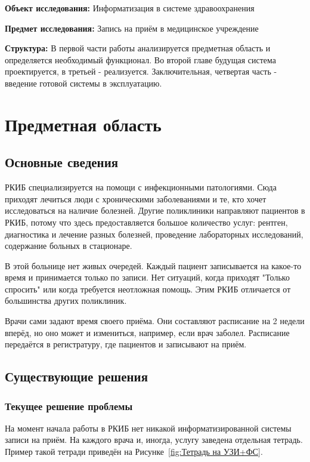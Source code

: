 \documentclass[a4paper,article]{article}
\begin{document}
        \textbf{Объект исследования:} Информатизация в системе здравоохранения

        \textbf{Предмет исследования:} Запись на приём в медицинское учреждение

        \textbf{Структура:} В первой части работы анализируется предметная область и определяется необходимый функционал. Во второй главе будущая система проектируется, в третьей - реализуется. Заключительная, четвертая часть - введение готовой системы в эксплуатацию.

        \newpage

    \section{Предметная область}

    \subsection{Основные сведения}

        РКИБ специализируется на помощи с инфекционными патологиями. Сюда приходят лечиться люди с хроническими заболеваниями и те, кто хочет исследоваться на наличие болезней. Другие поликлиники направляют пациентов в РКИБ, потому что здесь предоставляется большое количество услуг: рентген, диагностика и лечение разных болезней, проведение лабораторных исследований, содержание больных в стационаре.

        В этой больнице нет живых очередей. Каждый пациент записывается на какое-то время и принимается только по записи. Нет ситуаций, когда приходят "Только спросить" или когда требуется неотложная помощь. Этим РКИБ отличается от большинства других поликлиник.

        Врачи сами задают время своего приёма. Они составляют расписание на 2 недели вперёд, но оно может и измениться, например, если врач заболел. Расписание передаётся в регистратуру, где пациентов и записывают на приём.

    \subsection{Существующие решения}

    \subsubsection{Текущее решение проблемы}

        На момент начала работы в РКИБ нет никакой информатизированной системы записи на приём. На каждого врача и, иногда, услугу заведена отдельная тетрадь. Пример такой тетради приведён на Рисунке~\ref{fig:Тетрадь на УЗИ+ФС}.
\end{document}
